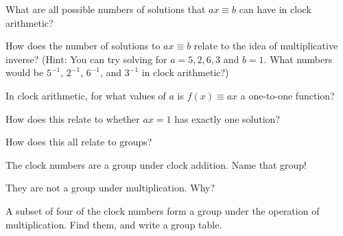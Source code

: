 \documentclass[../gatm_answers.tex]{subfiles}
\begin{document}
\begin{inner_problem}
\item What are all possible numbers of solutions that $ax\equiv b$ can have in clock arithmetic?
\end{inner_problem}

\begin{outer_problem}
\item How does the number of solutions to $ax\equiv b$ relate to the idea of multiplicative inverse? (Hint: You can try solving for $a=5,2,6,3$ and $b=1$. What numbers would be $5^{-1}$, $2^{-1}$, $6^{-1}$, and $3^{-1}$ in clock arithmetic?)
\end{outer_problem}

\begin{outer_problem}
\item
\end{outer_problem}

\begin{inner_problem}[start=1]
\item In clock arithmetic, for what values of $a$ is $f(x)\equiv ax$ a one-to-one function?
\end{inner_problem}

\begin{inner_problem}
\item How does this relate to whether $ax=1$ has exactly one solution?
\end{inner_problem}

\begin{outer_problem}
\item How does this all relate to groups?
\end{outer_problem}

\begin{inner_problem}[start=1]
\item The clock numbers are a group under clock addition. Name that group!
\end{inner_problem}

\begin{inner_problem}
\item They are not a group under multiplication. Why?
\end{inner_problem}

\begin{inner_problem}
\item A subset of four of the clock numbers form a group under the operation of multiplication. Find them, and write a group table.
\end{inner_problem}
\end{document}
